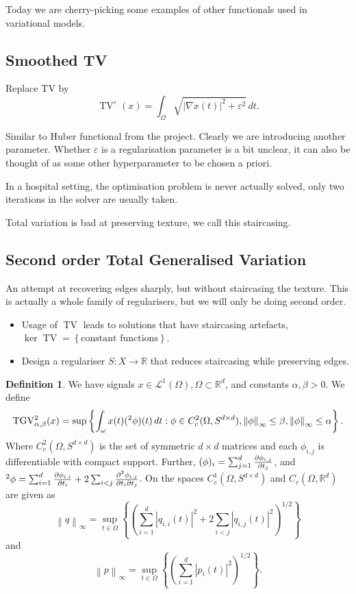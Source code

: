\documentclass[12pt]{article}
\theoremstyle{definition}
\newtheorem{definition}{Definition}[section]
\newcommand{\real}{\mathbb{R}}   %
\newcommand{\abs}[1]{\left|#1\right|}
\newcommand{\set}[1]{\left\{#1\right\}}
\DeclareMathOperator{\TV}{TV}
\DeclareMathOperator{\TGV}{TGV^2_{\alpha,\beta}}
\let\div\relax
\DeclareMathOperator{\div}{div}
\newcommand\norm[1]{\left\lVert#1\right\rVert}
\begin{document}
Today we are cherry-picking some examples of other functionals used in variational models.

\subsection{Smoothed TV}
Replace TV by $$\TV^\varepsilon(x) = \int_{\Omega} \sqrt{\abs{\nabla x(t)}^2 + \varepsilon^2}\,dt.$$

Similar to Huber functional from the project. Clearly we are introducing another parameter. Whether $\varepsilon$ is a regularisation parameter is a bit unclear, it can also be thought of as some other hyperparameter to be chosen a priori.

In a hospital setting, the optimisation problem is never actually solved, only two iterations in the solver are usually taken.

Total variation is bad at preserving texture, we call this staircasing.

\subsection{Second order Total Generalised Variation}
An attempt at recovering edges sharply, but without staircasing the texture. This is actually a whole family of regularisers, but we will only be doing second order.

\begin{itemize}
    \item Usage of $\TV$ leads to solutions that have staircasing artefacts, $\ker\TV = \set{\text{constant functions}}$.
    \item Design a regulariser $S:X\to\real$ that reduces staircasing while preserving edges. 
\end{itemize}
\begin{definition}
    We have signals $x\in\mathcal{L}^1(\Omega), \Omega\subset \real^d$, and constants $\alpha,\beta>0$. We define
    \begin{equation*}
        \TGV(x) = \sup \set{\int_\omega x(t)(\div^2\phi)(t)\,dt: \phi\in C_c^2(\Omega,S^{d\times d}), \norm{\phi}_\infty \leq \beta, \norm{\div \phi}_\infty \leq \alpha}.
    \end{equation*}
    Where $C_c^2(\Omega,S^{d\times d})$ is the set of symmetric $d\times d$ matrices and each $\phi_{i,j}$ is differentiable with compact support. Further, $(\div \phi)_i = \sum_{j=1}^d\frac{\partial \phi_{i,j}}{\partial t_j}$, and $\div^2 \phi = \sum_{i=1}^d\frac{\partial \phi_{i,i}}{\partial t_i} + 2\sum_{i<j} \frac{\partial^2\phi_{i,j}}{\partial t_i\partial t_j}$. On the spaces $C^1_c(\Omega,S^{d\times d})$ and
     $C_c(\Omega,\real^d)$ are given as $$\norm{q}_\infty = \sup_{t\in\Omega}\set{\left(\sum_{i=1}^d \abs{q_{i,i}(t)}^2 + 2\sum_{i<j}\abs{q_{i,j}(t)}^2\right)^{1/2}}$$ 
     and $$\norm{p}_\infty = \sup_{t\in\Omega} \set{\left(\sum_{i=1}^d \abs{p_i(t)}^2\right)^{1/2}}.$$
\end{definition}
\end{document}
